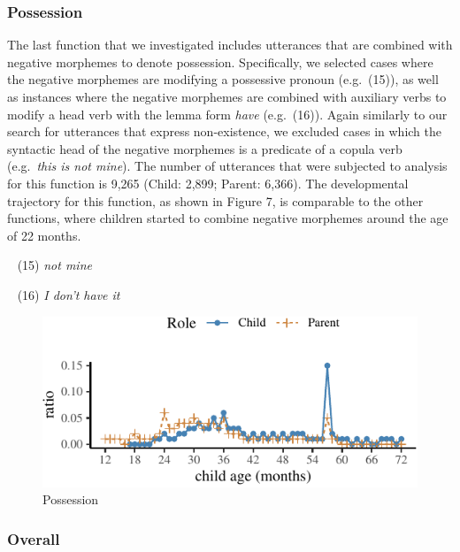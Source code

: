 \documentclass[
  english,
  man,floatsintext]{apa6}
\begin{document}
\hypertarget{possession}{%
\subsubsection{Possession}\label{possession}}

The last function that we investigated includes utterances that are combined with negative morphemes to denote possession. Specifically, we selected cases where the negative morphemes are modifying a possessive pronoun (e.g.~(15)), as well as instances where the negative morphemes are combined with auxiliary verbs to modify a head verb with the lemma form \emph{have} (e.g.~(16)). Again similarly to our search for utterances that express non-existence, we excluded cases in which the syntactic head of the negative morphemes is a predicate of a copula verb (e.g.~\emph{this is not mine}). The number of utterances that were subjected to analysis for this function is 9,265 (Child: 2,899; Parent: 6,366). The developmental trajectory for this function, as shown in Figure 7, is comparable to the other functions, where children started to combine negative morphemes around the age of 22 months.

~
(15) \emph{not mine}

~
(16) \emph{I don't have it}

\begin{figure}[H]

{\centering \includegraphics{neg_combos_full_files/figure-latex/possession-1} 

}

\caption{Possession}\label{fig:possession}
\end{figure}

\hypertarget{overall}{%
\subsubsection{Overall}\label{overall}}
\end{document}
